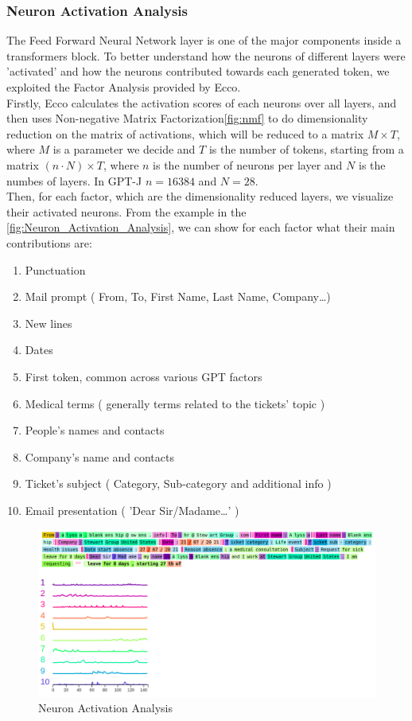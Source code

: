 \subsubsection*{Neuron Activation Analysis}
The Feed Forward Neural Network layer is one of the major components inside a transformers block. To better understand how the neurons of different layers were 'activated' and how the neurons contributed towards each generated token, we exploited the Factor Analysis provided by Ecco. \\
Firstly, Ecco calculates the activation scores of each neurons over all layers, and then uses Non-negative Matrix Factorization\ref{fig:nmf} to do dimensionality reduction on the matrix of activations, which will be reduced to a matrix $M{\times}T$, where $M$ is a parameter we decide and $T$ is the number of tokens, starting from a matrix $ ( n \cdot N ){\times}T$, where $n$ is the number of neurons per layer and $N$ is the numbes of layers.
In GPT-J  $n = 16384$ and $N = 28$. \\
Then, for each factor, which are the dimensionality reduced layers, we visualize their activated neurons.
From the example in the \autoref{fig:Neuron_Activation_Analysis}, we can show for each factor what their main contributions are:
\begin{enumerate}
    \item Punctuation
    \item Mail prompt ( From, To, First Name, Last Name, Company\dots)
    \item New lines
    \item Dates
    \item First token, common across various GPT factors
    \item Medical terms ( generally terms related to the tickets' topic )
    \item People's names and contacts
    \item Company's name and contacts
    \item Ticket's subject ( Category, Sub-category and additional info )
    \item Email presentation ( 'Dear Sir/Madame\dots' )
\end{enumerate}

\begin{figure}[h!] 
    \includegraphics[width=\textwidth]{images/Screenshot from 2022-11-28 15-26-01.png}
    \caption{Neuron Activation Analysis}
    \label{fig:Neuron_Activation_Analysis}
\end{figure}    


